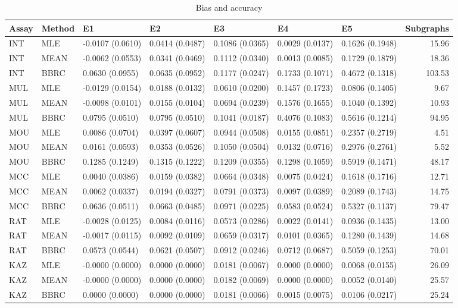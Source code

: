 \begin{table*}[t]
\begin{center}
  \begin{tabular}{lllllllr}
  \hline
 Assay & Method & E1 & E2 & E3 & E4 & E5 & Subgraphs \\ 
  \hline
  INT & MLE & -0.0107 (0.0610) & 0.0414 (0.0487) & 0.1086 (0.0365) & 0.0029 (0.0137) & 0.1626 (0.1948) & 15.96 \\ 
  INT & MEAN & -0.0062 (0.0553) & 0.0341 (0.0469) & 0.1112 (0.0340) & 0.0013 (0.0085) & 0.1729 (0.1879) & 18.36 \\ 
  INT & BBRC & 0.0630 (0.0955) & 0.0635 (0.0952) & 0.1177 (0.0247) & 0.1733 (0.1071) & 0.4672 (0.1318) & 103.53 \\ 
  MUL & MLE & -0.0129 (0.0154) & 0.0188 (0.0132) & 0.0610 (0.0200) & 0.1457 (0.1723) & 0.0806 (0.1405) & 9.67 \\ 
  MUL & MEAN & -0.0098 (0.0101) & 0.0155 (0.0104) & 0.0694 (0.0239) & 0.1576 (0.1655) & 0.1040 (0.1392) & 10.93 \\ 
  MUL & BBRC & 0.0795 (0.0510) & 0.0795 (0.0510) & 0.1041 (0.0187) & 0.4076 (0.1083) & 0.5616 (0.1214) & 94.95 \\ 
  MOU & MLE & 0.0086 (0.0704) & 0.0397 (0.0607) & 0.0944 (0.0508) & 0.0155 (0.0851) & 0.2357 (0.2719) & 4.51 \\ 
  MOU & MEAN & 0.0161 (0.0593) & 0.0353 (0.0526) & 0.1050 (0.0504) & 0.0132 (0.0716) & 0.2976 (0.2761) & 5.52 \\ 
  MOU & BBRC & 0.1285 (0.1249) & 0.1315 (0.1222) & 0.1209 (0.0355) & 0.1298 (0.1059) & 0.5919 (0.1471) & 48.17 \\ 
  MCC & MLE & 0.0040 (0.0386) & 0.0159 (0.0382) & 0.0664 (0.0348) & 0.0075 (0.0424) & 0.1618 (0.1716) & 12.71 \\ 
  MCC & MEAN & 0.0062 (0.0337) & 0.0194 (0.0327) & 0.0791 (0.0373) & 0.0097 (0.0389) & 0.2089 (0.1743) & 14.75 \\ 
  MCC & BBRC & 0.0636 (0.0511) & 0.0663 (0.0485) & 0.0971 (0.0225) & 0.0583 (0.0524) & 0.5327 (0.1137) & 79.47 \\ 
  RAT & MLE & -0.0028 (0.0125) & 0.0084 (0.0116) & 0.0573 (0.0286) & 0.0022 (0.0141) & 0.0936 (0.1435) & 13.00 \\ 
  RAT & MEAN & -0.0017 (0.0115) & 0.0092 (0.0109) & 0.0659 (0.0317) & 0.0101 (0.0365) & 0.1280 (0.1439) & 14.68 \\ 
  RAT & BBRC & 0.0573 (0.0544) & 0.0621 (0.0507) & 0.0912 (0.0246) & 0.0712 (0.0687) & 0.5059 (0.1253) & 70.01 \\ 
  KAZ & MLE & -0.0000 (0.0000) & 0.0000 (0.0000) & 0.0181 (0.0067) & 0.0000 (0.0000) & 0.0068 (0.0155) & 26.09 \\ 
  KAZ & MEAN & -0.0000 (0.0000) & 0.0000 (0.0000) & 0.0182 (0.0069) & 0.0000 (0.0000) & 0.0052 (0.0140) & 25.57 \\ 
  KAZ & BBRC & 0.0000 (0.0000) & 0.0000 (0.0000) & 0.0181 (0.0066) & 0.0015 (0.0075) & 0.0106 (0.0217) & 25.24 \\ 
   \hline
 \end{tabular}
\caption{Bias and accuracy}
\label{t:anal}
\end{center}
\end{table*}
